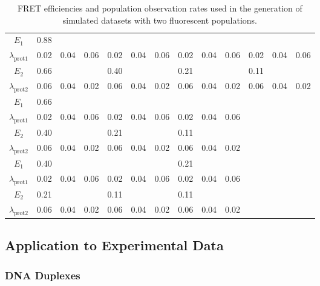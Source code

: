 \begin{center}
\begin{table}[ht]
\begin{tabular}{|ccccccccccccc|}
\hline
\textbf{$E_1$} & 0.88 & & & & & & & & & & & \\   
\textbf{$\lambda_{\text{prot} 1}$} & 0.02 & 0.04 & 0.06 & 0.02 & 0.04 & 0.06 & 0.02 & 0.04 & 0.06 & 0.02 & 0.04 & 0.06\\ 
\textbf{$E_2$} & 0.66 & & & 0.40 & & & 0.21 & & & 0.11 & & \\ 
\textbf{$\lambda_{\text{prot} 2}$} & 0.06 & 0.04 & 0.02 & 0.06 & 0.04 & 0.02 & 0.06 & 0.04 & 0.02 & 0.06 & 0.04 & 0.02 \\ 
\hline
\textbf{$E_1$} & 0.66 & & & & & & & & & & & \\ 
\textbf{$\lambda_{\text{prot} 1}$} & 0.02 & 0.04 & 0.06 & 0.02 & 0.04 & 0.06 & 0.02 & 0.04 & 0.06 & & & \\ 
\textbf{$E_2$} & 0.40 & & & 0.21 & & & 0.11 & & & & & \\
\textbf{$\lambda_{\text{prot} 2}$} & 0.06 & 0.04 & 0.02 & 0.06 & 0.04 & 0.02 & 0.06 & 0.04 & 0.02 & & & \\
\hline
\textbf{$E_1$} & 0.40 & & & & & & 0.21 & & & & & \\
\textbf{$\lambda_{\text{prot} 1}$} & 0.02 & 0.04 & 0.06 & 0.02 & 0.04 & 0.06 & 0.02 & 0.04 & 0.06 & & & \\
\textbf{$E_2$} & 0.21 & & & 0.11 & & & 0.11 & & & & & \\  
\textbf{$\lambda_{\text{prot} 2}$} & 0.06 & 0.04 & 0.02 & 0.06 & 0.04 & 0.02 & 0.06 & 0.04 & 0.02 & & & \\
\hline
\end{tabular}
\caption{FRET efficiencies and population observation rates used in the generation of simulated datasets with two fluorescent populations.}
\label{tab:rates}
\end{table} 
\end{center}

\subsection*{Application to Experimental Data}
\subsubsection*{DNA Duplexes}

